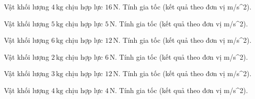 \begin{ex}
Vật khối lượng $4\,\text{kg}$ chịu hợp lực $16\,\text{N}$. Tính gia tốc (kết quả theo đơn vị m/s^2).
\end{ex}

\begin{ex}
Vật khối lượng $5\,\text{kg}$ chịu hợp lực $5\,\text{N}$. Tính gia tốc (kết quả theo đơn vị m/s^2).
\end{ex}

\begin{bt}
Vật khối lượng $6\,\text{kg}$ chịu hợp lực $12\,\text{N}$. Tính gia tốc (kết quả theo đơn vị m/s^2).
\end{bt}

\begin{bt}
Vật khối lượng $2\,\text{kg}$ chịu hợp lực $6\,\text{N}$. Tính gia tốc (kết quả theo đơn vị m/s^2).
\end{bt}

\begin{bt}
Vật khối lượng $3\,\text{kg}$ chịu hợp lực $12\,\text{N}$. Tính gia tốc (kết quả theo đơn vị m/s^2).
\end{bt}

\begin{bt}
Vật khối lượng $4\,\text{kg}$ chịu hợp lực $4\,\text{N}$. Tính gia tốc (kết quả theo đơn vị m/s^2).
\end{bt}

